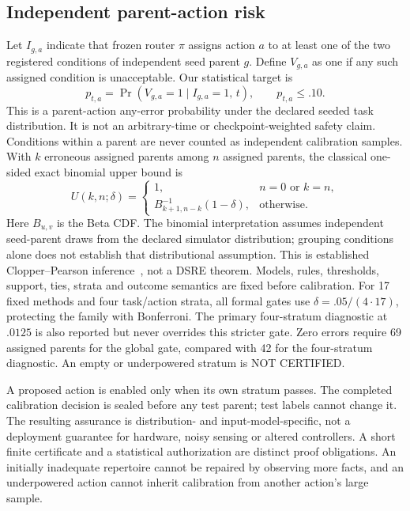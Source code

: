 \documentclass[conference]{IEEEtran}
\begin{document}
\subsection{Independent parent-action risk}
Let $I_{g,a}$ indicate that frozen router $\pi$ assigns action $a$ to at least one of the two registered conditions of independent seed parent $g$. Define $V_{g,a}$ as one if any such assigned condition is unacceptable. Our statistical target is
\begin{equation}
 p_{t,a}=\Pr(V_{g,a}=1\mid I_{g,a}=1,\,t),
 \qquad p_{t,a}\le .10.
\end{equation}
This is a parent-action any-error probability under the declared seeded task distribution. It is not an arbitrary-time or checkpoint-weighted safety claim. Conditions within a parent are never counted as independent calibration samples. With $k$ erroneous assigned parents among $n$ assigned parents, the classical one-sided exact binomial upper bound is
\begin{equation}
 U(k,n;\delta)=\begin{cases}
 1,&n=0\text{ or }k=n,\\
 B^{-1}_{k+1,n-k}(1-\delta),&\text{otherwise}.
 \end{cases}
\end{equation}
Here $B_{u,v}$ is the Beta CDF. The binomial interpretation assumes independent seed-parent draws from the declared simulator distribution; grouping conditions alone does not establish that distributional assumption. This is established Clopper--Pearson inference~\cite{clopper1934}, not a DSRE theorem. Models, rules, thresholds, support, ties, strata and outcome semantics are fixed before calibration. For 17 fixed methods and four task/action strata, all formal gates use $\delta=.05/(4\cdot 17)$, protecting the family with Bonferroni. The primary four-stratum diagnostic at $.0125$ is also reported but never overrides this stricter gate. Zero errors require 69 assigned parents for the global gate, compared with 42 for the four-stratum diagnostic. An empty or underpowered stratum is NOT CERTIFIED.

A proposed action is enabled only when its own stratum passes. The completed calibration decision is sealed before any test parent; test labels cannot change it. The resulting assurance is distribution- and input-model-specific, not a deployment guarantee for hardware, noisy sensing or altered controllers. A short finite certificate and a statistical authorization are distinct proof obligations. An initially inadequate repertoire cannot be repaired by observing more facts, and an underpowered action cannot inherit calibration from another action's large sample.
\end{document}
